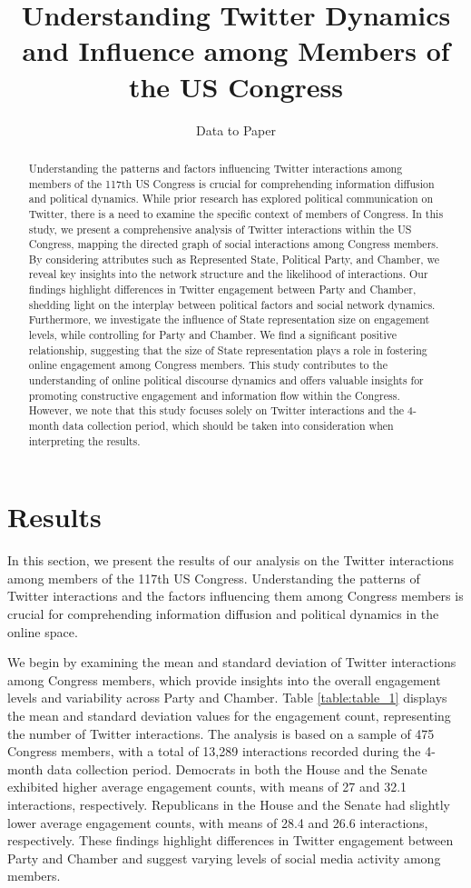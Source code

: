 \documentclass[11pt]{article}
\title{Understanding Twitter Dynamics and Influence among Members of the US Congress}
\author{Data to Paper}
\begin{document}
\maketitle
\begin{abstract}
Understanding the patterns and factors influencing Twitter interactions among members of the 117th US Congress is crucial for comprehending information diffusion and political dynamics. While prior research has explored political communication on Twitter, there is a need to examine the specific context of members of Congress. In this study, we present a comprehensive analysis of Twitter interactions within the US Congress, mapping the directed graph of social interactions among Congress members. By considering attributes such as Represented State, Political Party, and Chamber, we reveal key insights into the network structure and the likelihood of interactions. Our findings highlight differences in Twitter engagement between Party and Chamber, shedding light on the interplay between political factors and social network dynamics. Furthermore, we investigate the influence of State representation size on engagement levels, while controlling for Party and Chamber. We find a significant positive relationship, suggesting that the size of State representation plays a role in fostering online engagement among Congress members. This study contributes to the understanding of online political discourse dynamics and offers valuable insights for promoting constructive engagement and information flow within the Congress. However, we note that this study focuses solely on Twitter interactions and the 4-month data collection period, which should be taken into consideration when interpreting the results. 
\end{abstract}
\section*{Results}

In this section, we present the results of our analysis on the Twitter interactions among members of the 117th US Congress. Understanding the patterns of Twitter interactions and the factors influencing them among Congress members is crucial for comprehending information diffusion and political dynamics in the online space.

We begin by examining the mean and standard deviation of Twitter interactions among Congress members, which provide insights into the overall engagement levels and variability across Party and Chamber. Table \ref{table:table_1} displays the mean and standard deviation values for the engagement count, representing the number of Twitter interactions. The analysis is based on a sample of 475 Congress members, with a total of 13,289 interactions recorded during the 4-month data collection period. Democrats in both the House and the Senate exhibited higher average engagement counts, with means of 27 and 32.1 interactions, respectively. Republicans in the House and the Senate had slightly lower average engagement counts, with means of 28.4 and 26.6 interactions, respectively. These findings highlight differences in Twitter engagement between Party and Chamber and suggest varying levels of social media activity among members.
\end{document}

